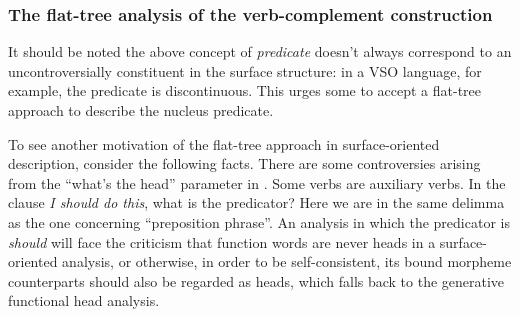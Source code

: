 \documentclass[UTF8, a4paper, oneside, scheme=plain]{ctexart}
\newcommand*{\term}[1]{\emph{#1}}
\newcommand*{\corpus}[1]{\emph{#1}}
\begin{document}
\subsubsection{The flat-tree analysis of the verb-complement construction}

It should be noted the above concept of \term{predicate} doesn't always correspond to 
an uncontroversially constituent in the surface structure:
in a VSO language, for example, the predicate is discontinuous.
This urges some to accept a flat-tree approach to describe the nucleus predicate.

To see another motivation of the flat-tree approach in surface-oriented description, consider the following facts.
There are some controversies arising from the ``what's the head'' parameter in .
Some verbs are auxiliary verbs.
In the clause \corpus{I should do this},
what is the predicator?
Here we are in the same delimma as the one concerning ``preposition phrase''.
An analysis in which the predicator is \corpus{should} will face the criticism 
that function words are never heads in a surface-oriented analysis,
or otherwise, in order to be self-consistent,
its bound morpheme counterparts should also be regarded as heads,
which falls back to the generative functional head analysis.
\end{document}
